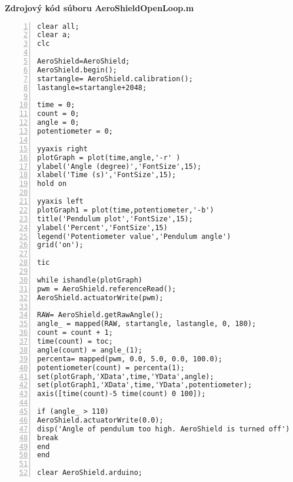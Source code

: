 \LARGE\bf{Zdrojový kód súboru AeroShieldOpenLoop.m}
\label{AeroShieldOpenLoop.m}
\vspace{1cm}
\begin{lstlisting}[numbers=left,basicstyle=\scriptsize,caption={Zdrojový kód súboru AeroShieldOpenLoop.m.},captionpos=b]	
clear all;
clear a;
clc 

AeroShield=AeroShield;
AeroShield.begin();
startangle= AeroShield.calibration(); 
lastangle=startangle+2048;

time = 0;
count = 0;
angle = 0;
potentiometer = 0;

yyaxis right  
plotGraph = plot(time,angle,'-r' )
ylabel('Angle (degree)','FontSize',15);
xlabel('Time (s)','FontSize',15); 
hold on  

yyaxis left 
plotGraph1 = plot(time,potentiometer,'-b')
title('Pendulum plot','FontSize',15);
ylabel('Percent','FontSize',15)  
legend('Potentiometer value','Pendulum angle')
grid('on');

tic    

while ishandle(plotGraph)  
pwm = AeroShield.referenceRead();
AeroShield.actuatorWrite(pwm);

RAW= AeroShield.getRawAngle();  
angle_ = mapped(RAW, startangle, lastangle, 0, 180);
count = count + 1;  
time(count) = toc;      
angle(count) = angle_(1);   
percenta= mapped(pwm, 0.0, 5.0, 0.0, 100.0); 
potentiometer(count) = percenta(1);          
set(plotGraph,'XData',time,'YData',angle);   
set(plotGraph1,'XData',time,'YData',potentiometer);
axis([time(count)-5 time(count) 0 100]);  

if (angle_ > 110)                         
AeroShield.actuatorWrite(0.0);    
disp('Angle of pendulum too high. AeroShield is turned off')
break                              
end
end             

clear AeroShield.arduino;
\end{lstlisting}